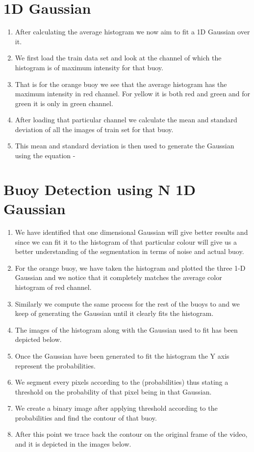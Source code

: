 \documentclass{article}
\begin{document}
\section{1D Gaussian}
\begin{enumerate}
    \item After calculating the average histogram we now aim to fit a 1D Gaussian over it.
    \item We first load the train data set and look at the channel of which the histogram is of maximum intensity
for that buoy.
    \item That is for the orange buoy we see that the average histogram has the maximum intensity in red
channel. For yellow it is both red and green and for green it is only in green channel.
    \item After loading that particular channel we calculate the mean and standard deviation of all the images
of train set for that buoy.
    \item This mean and standard deviation is then used to generate the Gaussian using the equation -
    
\end{enumerate}



\section{Buoy Detection using N 1D Gaussian}

\begin{enumerate}
    \item  We have identified that one dimensional Gaussian will give better results and
since we can fit it to the histogram of that particular colour will give us a better understanding of the
segmentation in terms of noise and actual buoy.
    \item For the orange buoy, we have taken the histogram and plotted the three 1-D Gaussian and we notice
that it completely matches the average color histogram of red channel.
    \item Similarly we compute the same process for the rest of the buoys to and we keep of generating the
Gaussian until it clearly fits the histogram.
    \item The images of the histogram along with the Gaussian used to fit has been depicted below.
    \item Once the Gaussian have been generated to fit the histogram the Y axis represent the probabilities.
    \item We segment every pixels according to the (probabilities) thus stating a threshold on the probability of
that pixel being in that Gaussian.
    \item We create a binary image after applying threshold according to the probabilities and find the contour
of that buoy.
    \item After this point we trace back the contour on the original frame of the video, and it is depicted in the
images below.
\end{enumerate}
\end{document}
